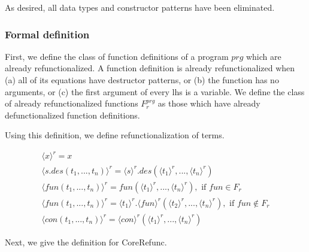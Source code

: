 As desired, all data types and constructor patterns have been eliminated.

\subsubsection{Formal definition}

First, we define the class of function definitions of a program $prg$ which are already refunctionalized. A function definition is already refunctionalized when (a) all of its equations have destructor patterns, or (b) the function has no arguments, or (c) the first argument of every lhs is a variable. We define the class of already refunctionalized functions $F^{prg}_r$ as those which have already defunctionalized function definitions.

Using this definition, we define refunctionalization of terms.

\begin{align*}
\langle x \rangle^r = x \\
\langle s.des(t_1, ..., t_n) \rangle^r = \langle s \rangle^r .des(\langle t_1 \rangle^r, ..., \langle t_n \rangle^r) \\
\langle fun(t_1, ..., t_n) \rangle^r = fun(\langle t_1 \rangle^r, ..., \langle t_n \rangle^r), \text{ if } fun \in F_r \\
\langle fun(t_1, ..., t_n) \rangle^r = \langle t_1 \rangle^r .\langle fun \rangle^r (\langle t_2 \rangle^r, ..., \langle t_n \rangle^r), \text{ if } fun \not\in F_r \\
\langle con(t_1, ..., t_n) \rangle^r = \langle con \rangle^r (\langle t_1 \rangle^r, ..., \langle t_n \rangle^r)
\end{align*}

Next, we give the definition for \textsf{CoreRefunc}.

